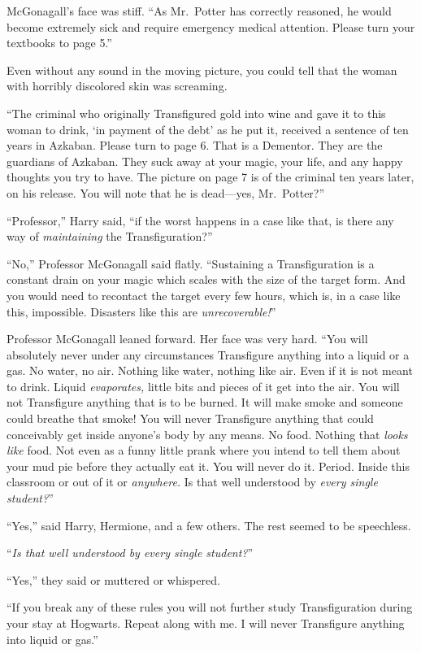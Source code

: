McGonagall’s face was stiff. “As Mr.~Potter has correctly reasoned, he would become extremely sick and require emergency medical attention. Please turn your textbooks to page 5.”

Even without any sound in the moving picture, you could tell that the woman with horribly discolored skin was screaming.

“The criminal who originally Transfigured gold into wine and gave it to this woman to drink, ‘in payment of the debt’ as he put it, received a sentence of ten years in Azkaban. Please turn to page 6. That is a Dementor. They are the guardians of Azkaban. They suck away at your magic, your life, and any happy thoughts you try to have. The picture on page 7 is of the criminal ten years later, on his release. You will note that he is dead—yes, Mr.~Potter?”

“Professor,” Harry said, “if the worst happens in a case like that, is there any way of \emph{maintaining} the Transfiguration?”

“No,” Professor McGonagall said flatly. “Sustaining a Transfiguration is a constant drain on your magic which scales with the size of the target form. And you would need to recontact the target every few hours, which is, in a case like this, impossible. Disasters like this are \emph{unrecoverable!}”

Professor McGonagall leaned forward. Her face was very hard. “You will absolutely never under any circumstances Transfigure anything into a liquid or a gas. No water, no air. Nothing like water, nothing like air. Even if it is not meant to drink. Liquid \emph{evaporates,} little bits and pieces of it get into the air. You will not Transfigure anything that is to be burned. It will make smoke and someone could breathe that smoke! You will never Transfigure anything that could conceivably get inside anyone’s body by any means. No food. Nothing that \emph{looks like} food. Not even as a funny little prank where you intend to tell them about your mud pie before they actually eat it. You will never do it. Period. Inside this classroom or out of it or \emph{anywhere.} Is that well understood by \emph{every single student?}”

“Yes,” said Harry, Hermione, and a few others. The rest seemed to be speechless.

“\emph{Is that well understood by every single student?}”

“Yes,” they said or muttered or whispered.

“If you break any of these rules you will not further study Transfiguration during your stay at Hogwarts. Repeat along with me. I will never Transfigure anything into liquid or gas.”

